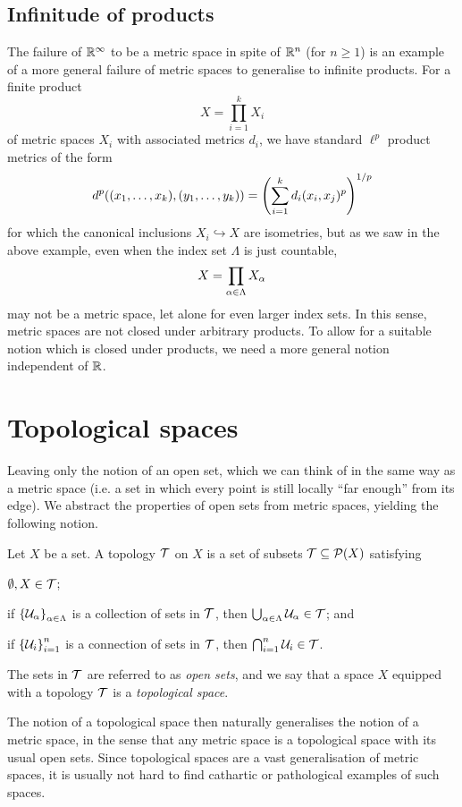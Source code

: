 \documentclass[11pt]{article}
\begin{document}
\subsection{Infinitude of products}
The failure of $\mathbb{R}^\infty$ to be a metric space in spite of $\mathbb{R}^n$ (for $n \geq 1$) is an example of a more general failure of metric spaces to generalise to infinite products. For a finite product 
$$
    X = \prod_{i = 1}^k X_i
$$
of metric spaces $X_i$ with associated metrics $d_i$, we have standard $\ell^p$ product metrics of the form
$$
    d^p((x_1, \ldots, x_k), (y_1, \ldots, y_k)) = \left(  \sum_{i = 1}^kd_i(x_i, x_j)^p  \right)^{1/p}
$$
for which the canonical inclusions $X_i \hookrightarrow X$ are isometries, but as we saw in the above example, even when the index set $\Lambda$ is just countable, $$
    X = \prod_{\alpha \in \Lambda} X_\alpha
$$
may not be a metric space, let alone for even larger index sets. In this sense, metric spaces are not closed under arbitrary products. To allow for a suitable notion which is closed under products, we need a more general notion independent of $\mathbb{R}$.
\section{Topological spaces}
Leaving only the notion of an open set, which we can think of in the same way as a metric space (i.e. a set in which every point is still locally ``far enough'' from its edge). We abstract the properties of open sets from metric spaces, yielding the following notion.
\begin{definition}
    Let $X$ be a set. A topology $\mathcal{T}$ on $X$ is a set of subsets $\mathcal{T} \subseteq \mathcal{P}(X)$ satisfying
    \begin{enum}
        \item $\emptyset, X \in \mathcal{T}$;
        \item if $\left\{  \mathcal{U}_\alpha  \right\}_{\alpha \in \Lambda}$ is a collection of sets in $\mathcal{T}$, then $\bigcup_{\alpha \in \Lambda} \mathcal{U}_\alpha \in \mathcal{T}$; and
        \item if $\left\{  \mathcal{U}_i  \right\}_{i = 1}^n$ is a connection of sets in $\mathcal{T}$, then $\bigcap_{i = 1}^n \mathcal{U}_i \in \mathcal{T}$.
    \end{enum}
    The sets in $\mathcal{T}$ are referred to as \emph{open sets}, and we say that a space $X$ equipped with a topology $\mathcal{T}$ is a \emph{topological space}.
\end{definition}
The notion of a topological space then naturally generalises the notion of a metric space, in the sense that any metric space is a topological space with its usual open sets. Since topological spaces are a vast generalisation of metric spaces, it is usually not hard to find cathartic or pathological examples of such spaces.
\end{document}
